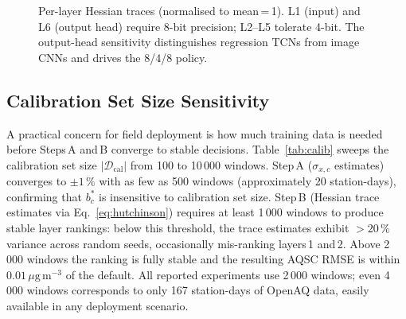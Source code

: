 \documentclass[12pt,a4paper]{article}
\begin{document}
\begin{figure}[ht]
\centering
{}
\caption{Per-layer Hessian traces (normalised to mean\,=\,1).
L1 (input) and L6 (output head) require 8-bit precision;
L2--L5 tolerate 4-bit.
The output-head sensitivity distinguishes regression TCNs from
image CNNs and drives the 8/4/8 policy.}
\label{fig:hessian}
\end{figure}

\subsection{Calibration Set Size Sensitivity}
\label{sec:sens_calib}

A practical concern for field deployment is how much training data is
needed before Steps\,A and\,B converge to stable decisions.
Table~\ref{tab:calib} sweeps the calibration set size
$|\mathcal{D}_\mathrm{cal}|$ from 100 to 10\,000 windows.
Step\,A ($\sigma_{x,c}$ estimates) converges to $\pm1\,\%$ with as
few as 500 windows (approximately 20 station-days), confirming that
$b_c^*$ is insensitive to calibration set size.
Step\,B (Hessian trace estimates via Eq.~\eqref{eq:hutchinson})
requires at least 1\,000 windows to produce stable layer rankings:
below this threshold, the trace estimates exhibit $>20\,\%$ variance
across random seeds, occasionally mis-ranking layers\,1 and\,2.
Above 2\,000 windows the ranking is fully stable and the resulting
AQSC RMSE is within $0.01\,\mu\mathrm{g\,m^{-3}}$ of the default.
All reported experiments use 2\,000 windows; even 4\,000 windows
corresponds to only 167 station-days of OpenAQ data, easily available
in any deployment scenario.
\end{document}
